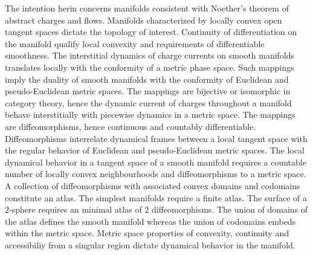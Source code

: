 \documentclass[aps,twocolumn,secnumarabic,nobalancelastpage,amsmath,amssymb,
amsthm,nofootinbib,parskip=full]{revtex4}
\numberwithin{equation}{section}
\begin{document}
The intention herin concerns manifolds consistent with
Noether's theorem of abstract charges and flows.
Manifolds characterized by locally convex open tangent spaces
dictate the topology of interest.
Continuity of differentiation on the manifold qualify local convexity
and requirements of differentiable smoothness.
The interstitial dynamics of charge currents on smooth manifolds
translates locally with the conformity of a metric phase space.
Such mappings imply the duality of smooth manifolds with
the conformity of Euclidean and pseudo-Euclidean metric spaces.
The mappings are bijective or isomorphic in category theory,
hence the dynamic current of charges throughout a manifold
behave interstitially with piecewise dynamics in a metric space.
The mappings are diffeomorphisms, hence continuous and countably differentiable.
Diffeomorphisms interrelate dynamical frames between a local tangent space
with the regular behavior of Euclidean and pseudo-Euclidean metric spaces.
The local dynamical behavior in a tangent space of a smooth manifold requires
a countable number of locally convex neighbourhoods and diffeomorphisms
to a metric space. A collection of diffeomorphisms with associated convex
domains and codomains constitute an atlas.
The simplest manifolds require a finite atlas.
The surface of a $2$-sphere requires an minimal atlas of 2 diffeomorphisms.
The union of domains of the atlas defines the smooth manifold
whereas the union of codomains embeds within the metric space.
Metric space properties of
convexity, continuity and accessibiliy from a singular region
dictate dynamical behavior in the manifold.
\end{document}
